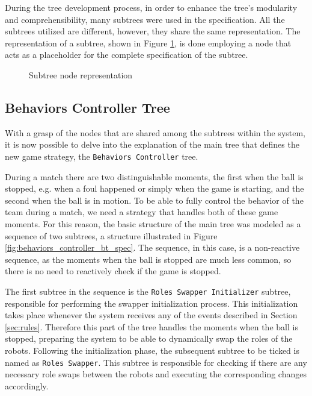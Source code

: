 During the tree development process, in order to enhance the tree's modularity and comprehensibility, many subtrees were used in the specification. All the subtrees utilized are different, however, they share the same representation. The representation of a subtree, shown in Figure \ref{fig:subtrees_spec}, is done employing a node that acts as a placeholder for the complete specification of the subtree.

\begin{figure}[!h]
    \centering
    \scalebox{1.} {
        \begin{forest}
        \end{forest}
    }
    \caption{Subtree node representation}
    \label{fig:subtrees_spec}
\end{figure}

\subsection{Behaviors Controller Tree}

With a grasp of the nodes that are shared among the subtrees within the system, it is now possible to delve into the explanation of the main tree that defines the new game strategy, the \texttt{Behaviors Controller} tree.

During a match there are two distinguishable moments, the first when the ball is stopped, e.g. when a foul happened or simply when the game is starting, and the second when the ball is in motion. To be able to fully control the behavior of the team during a match, we need a strategy that handles both of these game moments. For this reason, the basic structure of the main tree was modeled as a sequence of two subtrees, a structure illustrated in Figure \ref{fig:behaviors_controller_bt_spec}. The sequence, in this case, is a non-reactive sequence, as the moments when the ball is stopped are much less common, so there is no need to reactively check if the game is stopped.

The first subtree in the sequence is the \texttt{Roles Swapper Initializer} subtree, responsible for performing the swapper initialization process. This initialization takes place whenever the system receives any of the events described in Section \ref{sec:rules}. Therefore this part of the tree handles the moments when the ball is stopped, preparing the system to be able to dynamically swap the roles of the robots. Following the initialization phase, the subsequent subtree to be ticked is named as \texttt{Roles Swapper}. This subtree is responsible for checking if there are any necessary role swaps between the robots and executing the corresponding changes accordingly.


